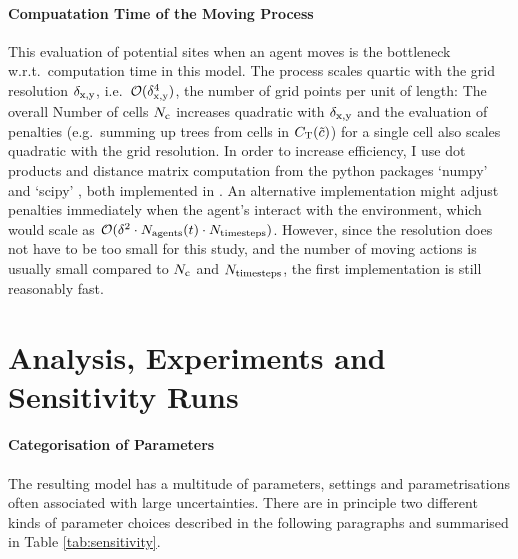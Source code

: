 \paragraph{Compuatation Time of the Moving Process}
This evaluation of potential sites when an agent moves is the bottleneck w.r.t.\ computation time in this model.
The process scales quartic with the grid resolution $\delta_{\rm x,y}$, i.e.\ $\mathcal{O}(\delta_{\rm x,y}^4)$, the number of grid points per unit of length: The overall Number of cells $N_{\rm c}$ increases quadratic with $\delta_{\rm x,y}$ and the evaluation of penalties (e.g.\ summing up trees from cells in $C_{\rm T}(\tilde{c})$) for a single cell also scales quadratic with the grid resolution.
In order to increase efficiency, I use dot products and distance matrix computation from the python packages `numpy' \citep{numpy} and `scipy' \citep{scipy}, both implemented in \CC.
An alternative implementation might adjust penalties immediately when the agent's interact with the environment, which would scale as $\mathcal{O}(\delta^2\cdot N_{\rm agents}(t)\cdot N_{\rm timesteps})$.
However, since the resolution does not have to be too small for this study, and the number of moving actions is usually small compared to $N_{\rm c}$ and $N_{\rm timesteps}$, the first implementation is still reasonably fast.
	
		
		
\section{Analysis, Experiments and Sensitivity Runs}
\paragraph{Categorisation of Parameters}
The resulting model has a multitude of parameters, settings and parametrisations often associated with large uncertainties. 
There are in principle two different kinds of parameter choices described in the following paragraphs and summarised in Table \ref{tab:sensitivity}.

